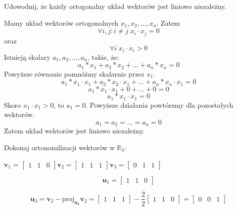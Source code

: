 \documentclass[12pt]{article}
\begin{document}
    \begin{exercise}
    Udowodnij, że każdy ortogonalny układ wektorów jest liniowo niezależny.
    \end{exercise}
    
    Mamy układ wektorów ortogonalnych  $x_1, x_2 ,\dots, x_n$. Zatem $$\forall i,j: i \neq j \; x_i \cdot x_j = 0$$ oraz $$\forall i \; x_i \cdot x_i > 0$$
    Istnieją skalary $a_1, a_2 ,\dots, a_n$, takie, że: $$a_1 * x_1 + a_2 * x_2 + \ldots + a_n * x_n = 0$$
    Powyższe równanie pomnóżmy skalarnie przez $x_1$. 
    $$a_1 * x_1 \cdot x_1 + a_2 * x_2 \cdot x_1 + \ldots + a_n * x_n \cdot x_1 = 0$$
    $$a_1 * x_1 \cdot x_1 + 0 + \ldots + 0 = 0$$
    $$a_1 * x_1 \cdot x_1 = 0$$
    Skoro $x_1 \cdot x_1 > 0$, to $a_1 = 0$. Powyższe działania powtórzmy dla pozostałych wektorów.
    $$a_1 = a_2 = \ldots = a_n = 0$$
    Zatem układ wektorów jest liniowo niezależny.
    \begin{exercise}
    Dokonaj ortonomilizacji wektorów w $\mathbb{R}_3$:             
    
    $\mathbf{v}_1$ =
    $\begin{bmatrix}
    1 & 1 & 0
    \end{bmatrix}
    \mathbf{v}_2 =
    \begin{bmatrix}
    1 & 1 & 1
    \end{bmatrix}
    \mathbf{v}_3 =
    \begin{bmatrix}
    0 & 1 & 1
    \end{bmatrix}$
    \end{exercise}
    
    $$
    \mathbf{u}_1 =
    \begin{bmatrix}
    1 & 1 & 0
    \end{bmatrix}
    $$
    
    $$
    \mathbf{u}_2 =  \mathbf{v}_2 - \mathrm{proj}_\mathbf{u_1} \mathbf{v}_2 = \begin{bmatrix}
    1 & 1 & 1
    \end{bmatrix}
    -
    \frac{2}{2}
    \begin{bmatrix}
    1 & 1 & 0
    \end{bmatrix}
    =
    \begin{bmatrix}
    0 & 0 & 1
    \end{bmatrix}
    $$
    
\end{document}

